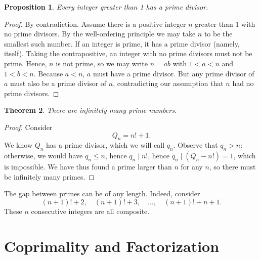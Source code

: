 \documentclass{amsbook}
\numberwithin{section}{chapter}
\theoremstyle{plain}
\newtheorem{thm}{Theorem}[section]
\newtheorem{prop}[thm]{Proposition}
\theoremstyle{definition}
\begin{document}
\pagebreak

\begin{prop}
Every integer greater than 1 has a prime divisor.
\end{prop}
\begin{proof}
By contradiction. Assume there is a positive integer $n$
greater than 1 with no prime divisors.
By the well-ordering principle we may take $n$ to be the smallest such
number. If an integer is prime,
it has a prime divisor (namely, itself).
Taking the contrapositive, an integer with no prime divisors must not
be prime. Hence, $n$ is not prime, so we may write $n = ab$ with
$1 < a < n$ and $1 < b < n$. Because $a < n$, $a$ must have a prime
divisor. But any prime divisor of $a$ must also be a prime divisor
of $n$, contradicting our assumption that $n$ had no prime divisors.
\end{proof}
\begin{thm}
There are infinitely many prime numbers.\footnotemark
\end{thm}
\begin{proof}
Consider
\[Q_n = n! + 1.\]
We know $Q_n$ has a prime divisor, which we will call $q_n$.
Observe that $q_n > n$: otherwise, we would have $q_n\le n$,
hence $q_n\mid n!$, hence $q_n\mid(Q_n - n!) = 1$, which is
impossible. We have thus found a prime larger than $n$
for any $n$, so there must be infinitely many primes.
\end{proof}
The gap between primes can be of any length.
Indeed, consider
\[(n+1)! + 2,\quad (n+1)! + 3,\quad\dots,\quad(n+1)! + n +1.\]
These $n$ consecutive integers are all composite.
\chapter{Coprimality and Factorization}
\end{document}

